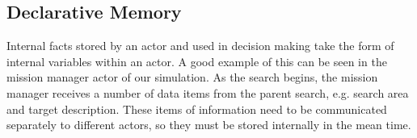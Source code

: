 \subsection{Declarative Memory }
Internal facts stored by an actor and used in decision making take the form of internal variables within an actor. A good example of this can be seen in the mission manager actor of our simulation. As the search begins, the mission manager receives a number of data items from the parent search, e.g. search area and target description. These items of information need to be communicated separately to different actors, so they must be stored internally in the mean time. 

